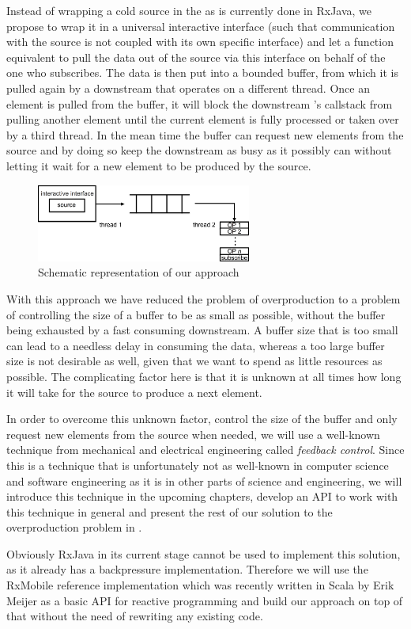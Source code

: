 Instead of wrapping a cold source in the  as is currently done in RxJava, we propose to wrap it in a universal interactive interface (such that communication with the source is not coupled with its own specific interface) and let a function equivalent to  pull the data out of the source via this interface on behalf of the one who subscribes. The data is then put into a bounded buffer, from which it is pulled again by a downstream \obs that operates on a different thread. Once an element is pulled from the buffer, it will block the downstream \obs's callstack from pulling another element until the current element is fully processed or taken over by a third thread. In the mean time the buffer can request new elements from the source and by doing so keep the downstream \obs as busy as it possibly can without letting it wait for a new element to be produced by the source.

\begin{figure}[H]
	\begin{center}
		\includegraphics[width=0.63\textwidth]{figures/Approach.png}
	\end{center}
	\caption{Schematic representation of our approach}
	\label{fig:new-approach}
\end{figure}

With this approach we have reduced the problem of overproduction to a problem of controlling the size of a buffer to be as small as possible, without the buffer being exhausted by a fast consuming downstream. A buffer size that is too small can lead to a needless delay in consuming the data, whereas a too large buffer size is not desirable as well, given that we want to spend as little resources as possible. The complicating factor here is that it is unknown at all times how long it will take for the source to produce a next element.

In order to overcome this unknown factor, control the size of the buffer and only request new elements from the source when needed, we will use a well-known technique from mechanical and electrical engineering called \textit{feedback control}. Since this is a technique that is unfortunately not as well-known in computer science and software engineering as it is in other parts of science and engineering, we will introduce this technique in the upcoming chapters, develop an API to work with this technique in general and present the rest of our solution to the overproduction problem in .

Obviously RxJava in its current stage cannot be used to implement this solution, as it already has a backpressure implementation. Therefore we will use the RxMobile \cite{RxMobile} reference implementation which was recently written in Scala by Erik Meijer as a basic API for reactive programming and build our approach on top of that without the need of rewriting any existing code.
